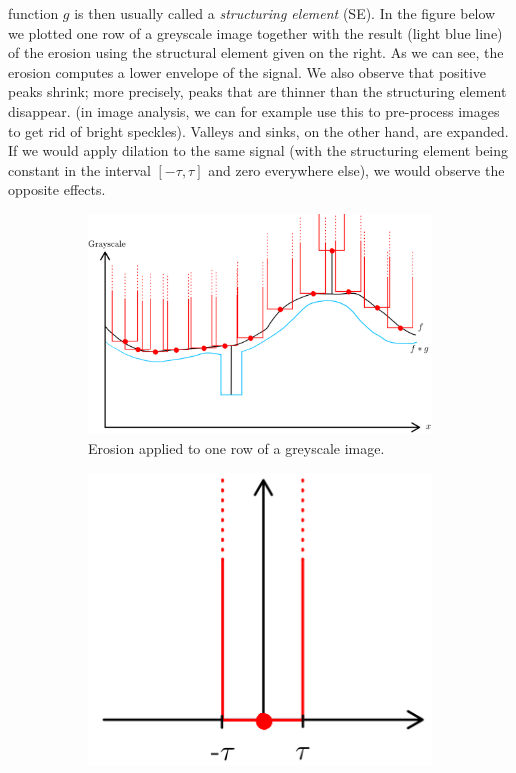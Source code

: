 function $g$ is then usually called a \emph{structuring element} (SE). In the
figure below we plotted one row of a greyscale image together with the result
(light blue line) of the erosion using the structural element given on the
right. As we can see, the erosion computes a lower envelope of the signal. We
also observe that positive peaks shrink; more precisely, peaks that are thinner
than the structuring element disappear.  (in image analysis, we can for example
use this to pre-process images to get rid of bright speckles). Valleys and
sinks, on the other hand, are expanded. If we would apply dilation to the same
signal (with the structuring element being constant in the interval
$[-\tau, \tau]$ and zero everywhere else), we would observe the opposite
effects.

\begin{figure}[htpb]
  \centering
  \begin{subfigure}[b]{0.5\textwidth}
    \includegraphics[width=\textwidth]{Figures/tropical_convolution}
    \caption{Erosion applied to one row of a greyscale image.}
  \end{subfigure}\hspace{3em}%
  \begin{subfigure}[b]{0.3\textwidth}
    \includegraphics[width=\textwidth]{Figures/structural_element}

\end{subfigure}
\end{figure}
